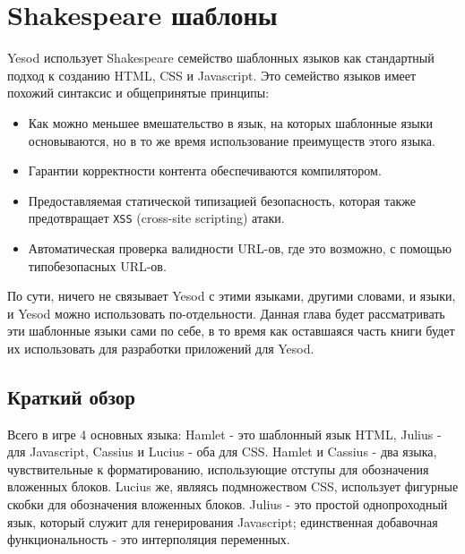 \chapter{Shakespeare шаблоны}\label{chap:shakespeare}

Yesod использует Shakespeare семейство шаблонных языков как стандартный 
подход к созданию HTML, CSS и Javascript. Это семейство языков имеет похожий 
синтаксис и общепринятые принципы: 

\begin{itemize}
\item Как можно меньшее вмешательство в язык, на которых шаблонные языки 
основываются, но в то же время использование преимуществ этого языка.
\item Гарантии корректности контента обеспечиваются компилятором.
\item Предоставляемая статической типизацией безопасность, которая также 
предотвращает \texttt{XSS} (cross-site scripting) атаки.
\item Автоматическая проверка валидности URL-ов, где это возможно, с помощью 
типобезопасных URL-ов.
\end{itemize}

По сути, ничего не связывает Yesod с этими языками, другими словами, и языки, 
и Yesod можно использовать по-отдельности. Данная глава будет рассматривать 
эти шаблонные языки сами по себе, в то время как оставшаяся часть книги 
будет их использовать для разработки приложений для Yesod.

\section{Краткий обзор}

Всего в игре 4 основных языка: Hamlet - это шаблонный язык HTML, 
Julius - для Javascript, Cassius и Lucius - оба для CSS. Hamlet и Cassius - 
два языка, чувствительные к форматированию, использующие отступы для 
обозначения вложенных блоков. Lucius же, являясь подмножеством CSS, использует
фигурные скобки для обозначения вложенных блоков. 
Julius - это простой однопроходный язык, который служит для 
генерирования Javascript; единственная добавочная функциональность - это 
интерполяция переменных.

